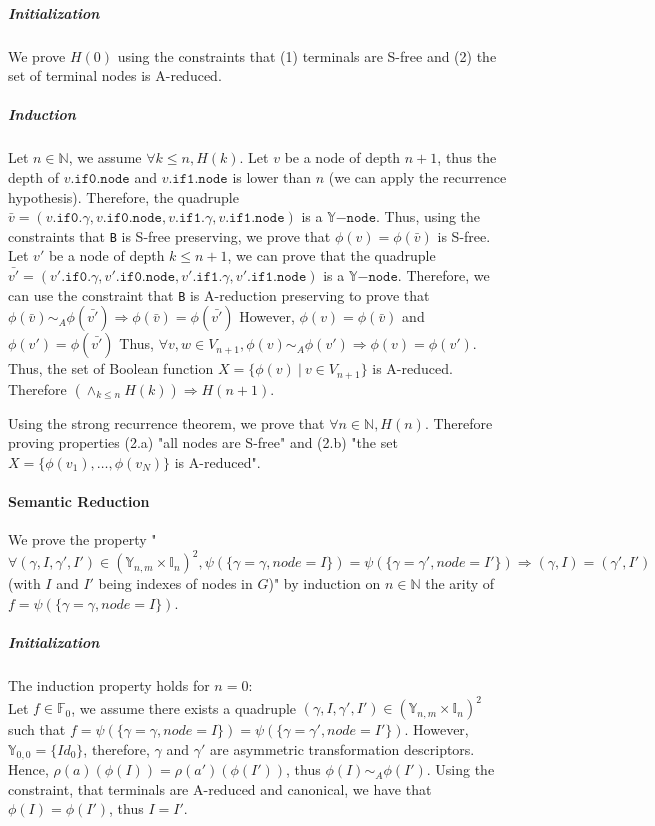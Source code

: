 \documentclass[a4paper,10pt]{article}
\newcommand{\N}{\mathbb{N}}%
\newcommand{\F}{\mathbb{F}}
\newcommand{\Y}{\mathbb{Y}}
\newcommand{\I}{\mathbb{I}}
\newcommand{\Ynode}{\Y\mathtt{-node}}
\newcommand{\fieldNode}{\texttt{node}}
\newcommand{\fieldGamma}{\mathtt{\gamma}}
\newcommand{\fieldThen}{\mathtt{if1}}
\newcommand{\fieldElse}{\mathtt{if0}}
\begin{document}
\subparagraph{Initialization}
We prove $H(0)$ using the constraints that (1) terminals are S-free and (2) the set of terminal nodes is A-reduced.

\subparagraph{Induction}
Let $n\in\N$, we assume $\forall k\leq n, H(k)$.
Let $v$ be a node of depth $n+1$, thus the depth of $v.\fieldElse{}.\fieldNode{}$ and $v.\fieldThen{}.\fieldNode{}$ is lower than $n$ (we can apply the recurrence hypothesis).
Therefore, the quadruple $\bar{v} = (v.\fieldElse{}.\fieldGamma{}, v.\fieldElse{}.\fieldNode{}, v.\fieldThen{}.\fieldGamma{}, v.\fieldThen{}.\fieldNode{})$ is a $\Ynode$.
Thus, using the constraints that \texttt{B} is S-free preserving, we prove that $\phi(v) = \phi(\bar{v})$ is S-free.
Let $v'$ be a node of depth $k\leq n+1$, we can prove that the quadruple $\bar{v'} = (v'.\fieldElse{}.\fieldGamma{}, v'.\fieldElse{}.\fieldNode{}, v'.\fieldThen{}.\fieldGamma{}, v'.\fieldThen{}.\fieldNode{})$ is a $\Ynode$.
Therefore, we can use the constraint that \texttt{B} is A-reduction preserving to prove that $\phi(\bar{v}) \sim_A \phi(\bar{v'}) \Rightarrow \phi(\bar{v}) = \phi(\bar{v'})$
However, $\phi(v) = \phi(\bar{v})$ and $\phi(v') = \phi(\bar{v'})$
Thus, $\forall v, w \in V_{n+1}, \phi(v) \sim_A \phi(v') \Rightarrow \phi(v) = \phi(v')$.
Thus, the set of Boolean function $X = \{\phi(v) ~|~ v\in V_{n+1}\}$ is A-reduced.
Therefore $\left(\land_{k\leq n} H(k)\right) \Rightarrow H(n+1)$.

Using the strong recurrence theorem, we prove that $\forall n\in\N, H(n)$.
Therefore proving properties (2.a) "all nodes are S-free" and (2.b) "the set $X = \{\phi(v_1), \dots, \phi(v_N)\}$ is A-reduced".

\paragraph{Semantic Reduction}
We prove the property "$\forall (\gamma, I, \gamma', I') \in (\Y_{n, m} \times \I_n)^2, \psi(\{\gamma = \gamma, node = I\}) = \psi(\{\gamma = \gamma', node = I'\}) \Rightarrow (\gamma, I) = (\gamma', I')$ (with $I$ and $I'$ being indexes of nodes in $G$)" by induction on $n\in\N$ the arity of $f = \psi(\{\gamma = \gamma, node = I\})$.

\subparagraph{Initialization}
The induction property holds for $n = 0$: \\
Let $f\in\F_0$, we assume there exists a quadruple $(\gamma, I, \gamma', I') \in (\Y_{n, m} \times \I_n)^2$ such that $f = \psi(\{\gamma = \gamma, node = I\}) = \psi(\{\gamma = \gamma', node = I'\})$.
However, $\Y_{0, 0} = \{Id_0\}$, therefore, $\gamma$ and $\gamma'$ are asymmetric transformation descriptors.
Hence, $\rho(a)(\phi(I)) = \rho(a')(\phi(I'))$, thus $\phi(I) \sim_A \phi(I')$.
Using the constraint, that terminals are A-reduced and canonical, we have that $\phi(I) = \phi(I')$, thus $I = I'$.
\end{document}
